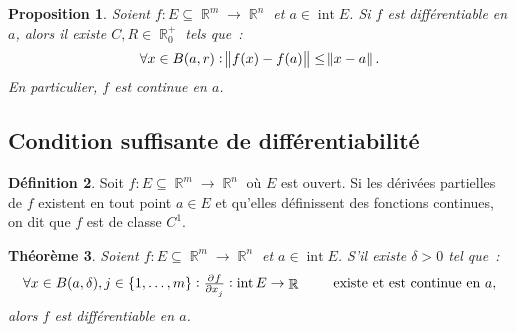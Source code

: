 \documentclass{article}
\DeclareMathOperator{\intr}{int}
\DeclareMathOperator{\R}{\mathbb R}
\newcommand{\frmrn}[2]{#1 : #2 \subseteq \R^m \to \R^n}
\newtheorem{thm}{Théorème}[section]
\newtheorem{prp}[thm]{Proposition}
\theoremstyle{definition}
\newtheorem{déf}[thm]{Définition}
\theoremstyle{remark}
\begin{document}
		\begin{prp} Soient $\frmrn fE$ et $a \in \intr E$. Si $f$ est différentiable en $a$, alors il existe $C, R \in  \R_0^+$ tels que~:
		\[\forall x \in B(a, r) : \norm{f(x)-f(a)} \leq \norm{x-a}.\]
		En particulier, $f$ est continue en $a$.
		\end{prp}

	\subsection{Condition suffisante de différentiabilité}
		\begin{déf} Soit $\frmrn fE$ où $E$ est ouvert. Si les dérivées partielles de $f$ existent en tout point $a \in E$ et qu'elles définissent des fonctions
		continues, on dit que $f$ est de classe $C^1$.
		\end{déf}

		\begin{thm}\label{thm:diffssipdcont} Soient $\frmrn fE$ et $a \in \intr E$. S'il existe $\delta > 0$ tel que~:
		\[\forall x \in B(a, \delta), j \in \{1, \dotsc, m\} : \pd f{x_j} : \intr E \to \R\qquad\text{ existe et est continue en $a$},\]
		alors $f$ est différentiable en $a$.
		\end{thm}
\end{document}
